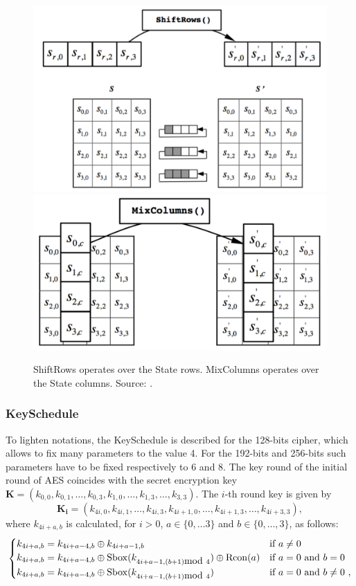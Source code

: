 \begin{figure}
\centering
\includegraphics[width = .45\textwidth]{../Figures/FISP_AES/shift_rows.pdf} 
\includegraphics[width = .45\textwidth]{../Figures/FISP_AES/mix_columns.pdf} 
\caption[ShiftRows and MixColumns.]{ShiftRows operates over the State rows. MixColumns operates over the State columns. Source: \cite{nist197}.}\label{fig:AES_sr_mc}
\end{figure}


\subsubsection*{KeySchedule}
To lighten notations, the KeySchedule is described for the 128-bits cipher, which allows to fix many parameters to the value 4. For the 192-bits and 256-bits such parameters have to be fixed respectively to 6 and 8. The key round of the initial round of AES coincides with the secret encryption key $\boldsymbol{K} = (k_{0,0},k_{0,1},\dots,k_{0,3}, k_{1,0},\dots,k_{1,3},\dots,k_{3,3})$. The $i$-th round key is given by 
\begin{equation*}
\boldsymbol{K_i} = (k_{4i,0},k_{4i,1},\dots,k_{4i,3}, k_{4i+1,0},\dots,k_{4i+1,3},\dots,k_{4i+3,3}),
\end{equation*}
where $k_{4i+a,b}$ is calculated, for $i>0$,  $a\in\{0,\dots 3\} $ and $ b\in\{0,\dots,3\}$, as follows: 
\begin{equation*}
\begin{cases}
k_{4i + a,b} = k_{4i +a-4,b}\oplus k_{4i +a-1,b} & \mbox{if } a \neq 0 \\
k_{4i + a,b} = k_{4i +a-4,b}\oplus \mathrm{Sbox}(k_{4i +a-1,(b+1) \mbox{mod } 4}) \oplus \mathrm{Rcon}(a) & \mbox{if } a = 0 \mbox{ and } b=0\\
k_{4i + a,b} = k_{4i+a-4,b}\oplus \mathrm{Sbox}(k_{4i+a-1,(b+1) \mbox{mod } 4})  & \mbox{if } a =0 \mbox{ and } b\neq 0 \mbox{ ,} 
\end{cases}
\end{equation*}

